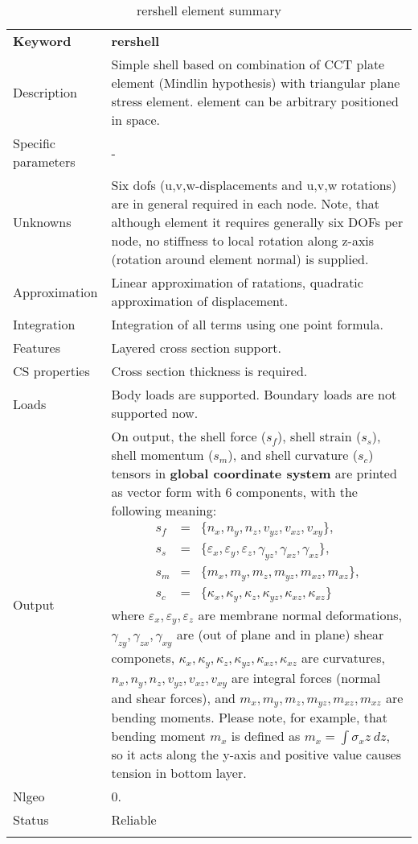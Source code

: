 \documentclass[a4paper]{article}
\newcommand{\param}[1]{\texttt{#1}} %
\newcommand{\templabel}{}%
\newcommand{\tempcaption}{}%
\newcounter{nelpar}
\newenvironment{elementsummary}[5]{%
  \gdef\tempcaption{#4}%
  \gdef\templabel{#5}%
  \setcounter{nelpar}{0}%
  \begin{center} %
    \begin{table}[!htb] %
      \begin{tabular}{|l|p{9cm}|}\hline %
        {\bf Keyword} & \bf{#1}\\ %
        {Description} & {#2}\\ %
        {Specific parameters} & {#3}\\ \hline %
}{
  \\ \hline %
      \end{tabular}%
      \caption{\tempcaption}%
      \label{\templabel}%
    \end{table}%
  \end{center}%
}
\newcommand{\elementParam}[1]{%
  \ifthenelse{\value{nelpar}>0} %
             {&{#1}}%
             {\setcounter{nelpar}{1}Parameters&{#1}}%
             \\%
}
\newcommand{\elementDescription}[2]{{#1} & {#2}\\ }
\begin{document}
\begin{elementsummary}{rershell}{Simple shell based on combination of CCT plate element (Mindlin hypothesis) with triangular plane stress element. element can be arbitrary positioned in space.}{-}{rershell element summary}{rershellsummary}
\elementDescription{Unknowns}{Six dofs (u,v,w-displacements and u,v,w rotations) are in general required in each node. Note, that although element it requires generally six DOFs per node, no stiffness to local rotation along z-axis (rotation around element normal) is supplied.}
\elementDescription{Approximation}{Linear approximation of ratations, quadratic approximation of displacement.}
\elementDescription{Integration}{Integration of all terms using one point formula.}
\elementDescription{Features}{Layered cross section support.}
\elementDescription{CS properties}{Cross section thickness is required.}
\elementDescription{Loads}{Body loads are supported. Boundary loads are not supported now.}
\elementDescription{Output}{On output, the shell force ($s_f$), shell strain ($s_s$), shell momentum ($s_m$), and shell curvature ($s_c$) tensors in \textbf{global coordinate system} are printed as vector form with 6 components, with the following meaning:
\begin{eqnarray*}
s_f&=&\{n_x, n_y, n_z, v_{yz}, v_{xz}, v_{xy}\},\\
s_s&=&\{\varepsilon_x, \varepsilon_y, \varepsilon_z, \gamma_{yz}, \gamma_{xz}, \gamma_{xz}\},\\
s_m&=&\{m_x, m_y, m_z, m_{yz}, m_{xz}, m_{xz}\},\\
s_c&=&\{\kappa_x, \kappa_y, \kappa_z, \kappa_{yz}, \kappa_{xz}, \kappa_{xz}\}
\end{eqnarray*}
where $\varepsilon_x, \varepsilon_y, \varepsilon_z$ are membrane normal deformations, $\gamma_{zy}, \gamma_{zx}, \gamma_{xy}$ are (out of plane and in plane) shear componets, $\kappa_x, \kappa_y, \kappa_z, \kappa_{yz}, \kappa_{xz}, \kappa_{xz}$ are curvatures, $n_x, n_y, n_z, v_{yz}, v_{xz}, v_{xy}$ are integral forces (normal and shear forces), and $m_x, m_y, m_z, m_{yz}, m_{xz}, m_{xz}$ are bending moments. 
Please note, for example, that bending moment $m_x$ is defined as $m_x=\int \sigma_x z\ dz$, so it acts along the y-axis and positive value causes tension in bottom layer.}
\elementDescription{Nlgeo}{0.}
\elementDescription{Status}{Reliable}
\end{elementsummary}
\end{document}
